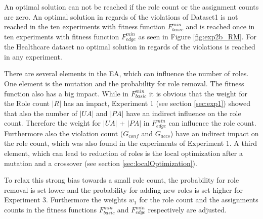An optimal solution can not be reached if the role count or the assignment counts are zero. An optimal solution in regards of the violations of Dataset1 is not reached in the ten experiments with fitness function $F_{basic}^{min}$ and is reached once in ten experiments with fitness function $F_{edge}^{min}$ as seen in Figure \ref{fig:exp2b_RM}. For the Healthcare dataset no optimal solution in regards of the violations is reached in any experiment.

There are several elements in the EA, which can influence the number of roles. One element is the mutation and the probability for role removal. The fitness function also has a big impact. While in $F_{basic}^{min}$ it is obvious that the weight for the Role count $|R|$ has an impact, Experiment 1 (see section \ref{sec:exp1}) showed that also the number of $|UA|$ and $|PA|$ have an indirect influence on the role count. Therefore the weight for $|UA|$ + $|PA|$ in $F_{edge}^{min}$ can influence the role count. Furthermore also the violation count ($G_{conf}$ and $G_{accs}$) have an indirect impact on the role count, which was also found in the experiments of Experiment 1. A third element, which can lead to reduction of roles is the local optimization after a mutation and a crossover (see section \ref{sec:localOptimization}).

To relax this strong bias towards a small role count, the probability for role removal is set lower and the probability for adding new roles is set higher for Experiment 3. Furthermore the weights $w_1$ for the role count and the assignments counts in the fitness functions $F_{basic}^{min}$ and $F_{edge}^{min}$ respectively are adjusted.